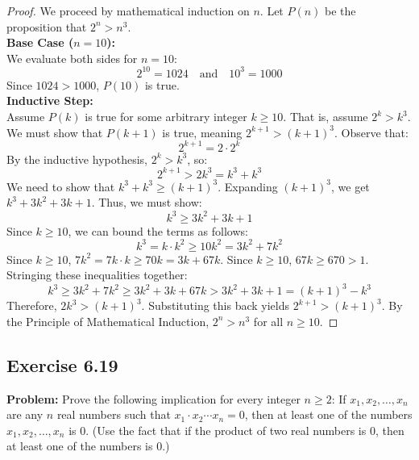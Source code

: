 \documentclass[11pt, a4paper]{article}
\theoremstyle{definition}
\theoremstyle{remark}
\begin{document}
\begin{proof}
We proceed by mathematical induction on $n$. Let $P(n)$ be the proposition that $2^n > n^3$.
\vspace{4pt} \\
\textbf{Base Case ($n = 10$):} \\
We evaluate both sides for $n = 10$:
\[ 2^{10} = 1024 \quad \text{and} \quad 10^3 = 1000 \]
Since $1024 > 1000$, $P(10)$ is true.
\vspace{4pt} \\
\textbf{Inductive Step:} \\
Assume $P(k)$ is true for some arbitrary integer $k \ge 10$. That is, assume $2^k > k^3$. We must show that $P(k+1)$ is true, meaning $2^{k+1} > (k+1)^3$.
Observe that:
\[ 2^{k+1} = 2 \cdot 2^k \]
By the inductive hypothesis, $2^k > k^3$, so:
\[ 2^{k+1} > 2k^3 = k^3 + k^3 \]
We need to show that $k^3 + k^3 \ge (k+1)^3$. Expanding $(k+1)^3$, we get $k^3 + 3k^2 + 3k + 1$. Thus, we must show:
\[ k^3 \ge 3k^2 + 3k + 1 \]
Since $k \ge 10$, we can bound the terms as follows:
\[ k^3 = k \cdot k^2 \ge 10k^2 = 3k^2 + 7k^2 \]
Since $k \ge 10$, $7k^2 = 7k \cdot k \ge 70k = 3k + 67k$.
Since $k \ge 10$, $67k \ge 670 > 1$.
Stringing these inequalities together:
\[ k^3 \ge 3k^2 + 7k^2 \ge 3k^2 + 3k + 67k > 3k^2 + 3k + 1 = (k+1)^3 - k^3 \]
Therefore, $2k^3 > (k+1)^3$. Substituting this back yields $2^{k+1} > (k+1)^3$. 
By the Principle of Mathematical Induction, $2^n > n^3$ for all $n \ge 10$.
\end{proof}

\subsection{Exercise 6.19}
\textbf{Problem:} Prove the following implication for every integer $n \ge 2$: If $x_1, x_2, \dots, x_n$ are any $n$ real numbers such that $x_1 \cdot x_2 \cdots x_n = 0$, then at least one of the numbers $x_1, x_2, \dots, x_n$ is $0$. (Use the fact that if the product of two real numbers is $0$, then at least one of the numbers is $0$.)
\end{document}
